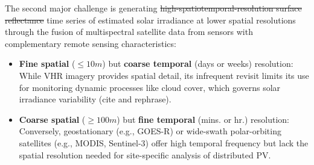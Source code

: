     The second major challenge is generating \st{high-spatiotemporal-resolution surface reflectance} time series of estimated solar irradiance at lower spatial resolutions  through the fusion of multispectral satellite data from sensors with complementary remote sensing characteristics: 
    \begin{itemize}
        \item \textbf{Fine spatial} ($\le10m$) but \textbf{coarse temporal} (days or weeks) resolution: \\
        While VHR imagery provides spatial detail, its infrequent revisit limits its use for monitoring dynamic processes like cloud cover, which governs solar irradiance variability (cite and rephrase). 
        \item \textbf{Coarse spatial} ($\ge100m$) but \textbf{fine temporal} (mins. or hr.) resolution: \\
        Conversely, geostationary (e.g., GOES-R) or wide-swath polar-orbiting satellites (e.g., MODIS, Sentinel-3) offer high temporal frequency but lack the spatial resolution needed for site-specific analysis of distributed PV. 
    \end{itemize}